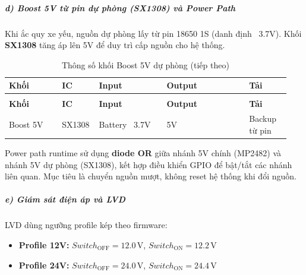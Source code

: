 \documentclass[a4paper]{extarticle}
\newcommand{\thesissettableid}[2]{%
  \renewcommand{\thetable}{#1}%
  \renewcommand{\theHtable}{#2}%
}
\providecommand{\tightlist}{%
  \setlength{\itemsep}{0pt}\setlength{\parskip}{0pt}}
\begin{document}
\subparagraph{d) Boost 5V từ pin dự phòng (SX1308) và Power
Path}\label{d-boost-5v-tux1eeb-pin-dux1ef1-phuxf2ng-sx1308-vuxe0-power-path}

Khi ắc quy xe yếu, nguồn dự phòng lấy từ pin 18650 1S (danh định
~3.7V). Khối \textbf{SX1308} tăng áp lên 5V để duy trì cấp
nguồn cho hệ thống.


{\thesissettableid{3.11}{tab-ch3-thong-so-khoi-boost-5v-du-phong}
\def\LTcaptype{table}
\begin{longtable}{|L{0.189\linewidth}|L{0.094\linewidth}|L{0.236\linewidth}|L{0.283\linewidth}|L{0.142\linewidth}|}
\caption{Thông số khối Boost 5V dự phòng}\label{tab:ch3-thong-so-khoi-boost-5v-du-phong}\\
\hline \textbf{Khối} & \textbf{IC} & \textbf{Input} & \textbf{Output} & \textbf{Tải} \\
\hline
\endfirsthead
\caption[]{Thông số khối Boost 5V dự phòng (tiếp theo)}\\
\hline \textbf{Khối} & \textbf{IC} & \textbf{Input} & \textbf{Output} & \textbf{Tải} \\
\hline
\endhead
\hline
\endfoot
\endlastfoot
Boost 5V & SX1308 & Battery ~3.7V & 5V & Backup từ pin \\\hline
\end{longtable}
}


Power path runtime sử dụng \textbf{diode OR} giữa nhánh 5V chính
(MP2482) và nhánh 5V dự phòng (SX1308), kết hợp điều khiển GPIO để
bật/tắt các nhánh liên quan. Mục tiêu là chuyển nguồn mượt, không reset
hệ thống khi đổi nguồn.

\subparagraph{e) Giám sát điện áp và
LVD}\label{e-giuxe1m-suxe1t-ux111iux1ec7n-uxe1p-vuxe0-lvd}

LVD dùng ngưỡng profile kép theo firmware:

\begin{itemize}
\tightlist
\item
  \textbf{Profile 12V:} \(Switch_{\mathrm{OFF}} = 12.0\,\mathrm{V}\),
  \(Switch_{\mathrm{ON}} = 12.2\,\mathrm{V}\)
\item
  \textbf{Profile 24V:} \(Switch_{\mathrm{OFF}} = 24.0\,\mathrm{V}\),
  \(Switch_{\mathrm{ON}} = 24.4\,\mathrm{V}\)
\end{itemize}
\end{document}
